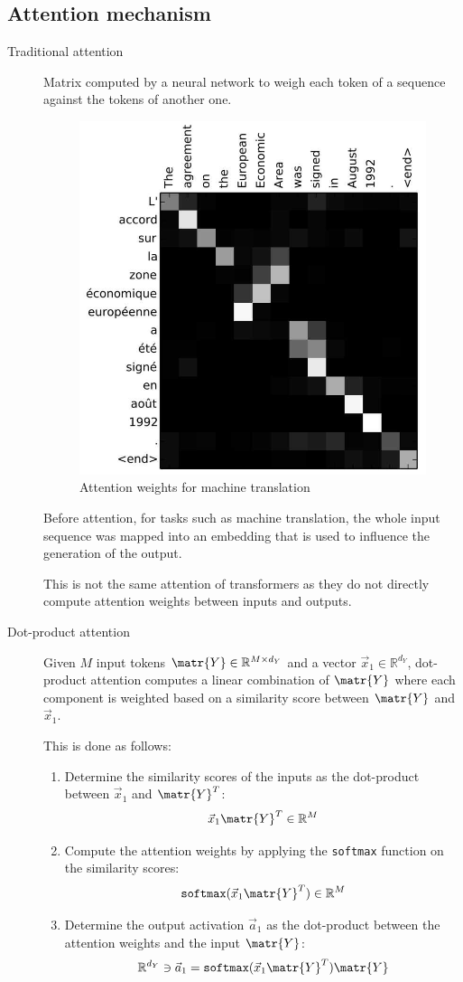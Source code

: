 \subsection{Attention mechanism}


\begin{description}
    \item[Traditional attention] 
        Matrix computed by a neural network to weigh each token of a sequence against the tokens of another one.

        \begin{figure}[H]
            \centering
            \includegraphics[width=0.3\linewidth]{./img/traditional_attention.jpg}
            \caption{Attention weights for machine translation}
        \end{figure}

        \begin{remark}
            Before attention, for tasks such as machine translation, the whole input sequence was mapped into an embedding that is used to influence the generation of the output.
        \end{remark}

        \begin{remark}
            This is not the same attention of transformers as they do not directly compute attention weights between inputs and outputs.
        \end{remark}

    \item[Dot-product attention] 
        Given $M$ input tokens $\matr{Y} \in \mathbb{R}^{M \times d_Y}$ and a vector $\vec{x}_1 \in \mathbb{R}^{d_Y}$, dot-product attention computes a linear combination of $\matr{Y}$ where each component is weighted based on a similarity score between $\matr{Y}$ and $\vec{x}_1$.

        This is done as follows:
        \begin{enumerate}
            \item Determine the similarity scores of the inputs as the dot-product between $\vec{x}_1$ and $\matr{Y}^T$:
                \[ \vec{x}_1 \matr{Y}^T \in \mathbb{R}^{M} \]
            \item Compute the attention weights by applying the \texttt{softmax} function on the similarity scores:
                \[ \texttt{softmax}(\vec{x}_1 \matr{Y}^T) \in \mathbb{R}^{M} \]
            \item Determine the output activation $\vec{a}_1$ as the dot-product between the attention weights and the input $\matr{Y}$:
                \[ \mathbb{R}^{d_Y} \ni \vec{a}_1 = \texttt{softmax}(\vec{x}_1 \matr{Y}^T) \matr{Y} \]
        \end{enumerate}


\end{description}
